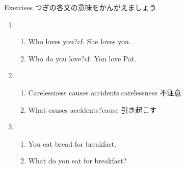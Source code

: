 \documentclass[aspectratio=169,xcolor={dvipsnames,table}]{beamer}
\begin{document}
\begin{frame}[plain]{Exercises}
\textdbend\textdbend つぎの各文の意味をかんがえましょう

\begin{enumerate}
 \item \begin{enumerate}
		  \item Who loves you?\hfill{}cf. She loves you.
		  \item Who do you love?\hfill{}cf. You love Pat. 
		 \end{enumerate}
 \item \begin{enumerate}
	\item Carelessness causes accidents.\hfill{\scriptsize carelessness  不注意}
	\item What causes accidents?\hfill{\scriptsize cause  引き起こす}
       \end{enumerate}
 \item \begin{enumerate}
	\item You eat bread for breakfast.
	\item What do you eat for breakfast?
       \end{enumerate}
\end{enumerate}
\hfill{\scriptsize {}}

\end{frame}
\end{document}
